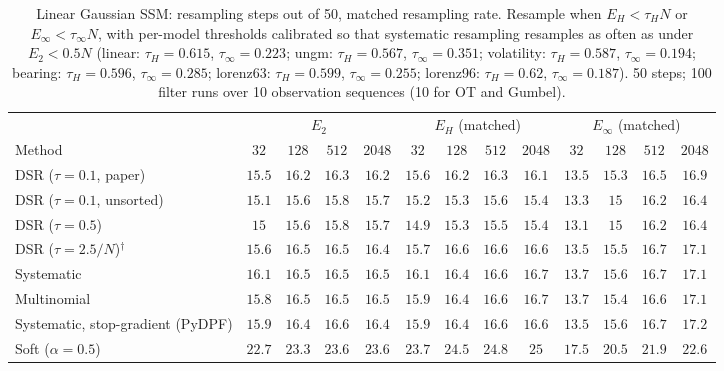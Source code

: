 \begin{table}[ht]
\centering
\small
\caption{Linear Gaussian SSM: resampling steps out of 50, matched resampling rate. Resample when $E_H<\tau_HN$ or $E_\infty<\tau_\infty N$, with per-model thresholds calibrated so that systematic resampling resamples as often as under $E_2<0.5N$ (linear: $\tau_H{=}0.615$, $\tau_\infty{=}0.223$; ungm: $\tau_H{=}0.567$, $\tau_\infty{=}0.351$; volatility: $\tau_H{=}0.587$, $\tau_\infty{=}0.194$; bearing: $\tau_H{=}0.596$, $\tau_\infty{=}0.285$; lorenz63: $\tau_H{=}0.599$, $\tau_\infty{=}0.255$; lorenz96: $\tau_H{=}0.62$, $\tau_\infty{=}0.187$). 50 steps; 100 filter runs over 10 observation sequences (10 for OT and Gumbel).}
\label{tab:trigger-matched-linear-resampling_steps}
\begin{adjustbox}{max width=\linewidth}
\begin{tabular}{lcccc|cccc|cccc}
\toprule
 & \multicolumn{4}{c}{$E_2$} & \multicolumn{4}{c}{$E_H$ (matched)} & \multicolumn{4}{c}{$E_\infty$ (matched)} \\
\cmidrule(lr){2-5} \cmidrule(lr){6-9} \cmidrule(lr){10-13}
Method & $32$ & $128$ & $512$ & $2048$ & $32$ & $128$ & $512$ & $2048$ & $32$ & $128$ & $512$ & $2048$ \\
\midrule
DSR ($\tau{=}0.1$, paper) & $15.5$ & $16.2$ & $16.3$ & $16.2$ & $15.6$ & $16.2$ & $16.3$ & $16.1$ & $13.5$ & $15.3$ & $16.5$ & $16.9$ \\
DSR ($\tau{=}0.1$, unsorted) & $15.1$ & $15.6$ & $15.8$ & $15.7$ & $15.2$ & $15.3$ & $15.6$ & $15.4$ & $13.3$ & $15$ & $16.2$ & $16.4$ \\
DSR ($\tau{=}0.5$) & $15$ & $15.6$ & $15.8$ & $15.7$ & $14.9$ & $15.3$ & $15.5$ & $15.4$ & $13.1$ & $15$ & $16.2$ & $16.4$ \\
DSR ($\tau{=}2.5/N$)$^\dagger$ & $15.6$ & $16.5$ & $16.5$ & $16.4$ & $15.7$ & $16.6$ & $16.6$ & $16.6$ & $13.5$ & $15.5$ & $16.7$ & $17.1$ \\
\midrule
Systematic & $16.1$ & $16.5$ & $16.5$ & $16.5$ & $16.1$ & $16.4$ & $16.6$ & $16.7$ & $13.7$ & $15.6$ & $16.7$ & $17.1$ \\
Multinomial & $15.8$ & $16.5$ & $16.5$ & $16.5$ & $15.9$ & $16.4$ & $16.6$ & $16.7$ & $13.7$ & $15.4$ & $16.6$ & $17.1$ \\
Systematic, stop-gradient (PyDPF) & $15.9$ & $16.4$ & $16.6$ & $16.4$ & $15.9$ & $16.4$ & $16.6$ & $16.6$ & $13.5$ & $15.6$ & $16.7$ & $17.2$ \\
Soft ($\alpha{=}0.5$) & $22.7$ & $23.3$ & $23.6$ & $23.6$ & $23.7$ & $24.5$ & $24.8$ & $25$ & $17.5$ & $20.5$ & $21.9$ & $22.6$ \\

\end{tabular}
\end{adjustbox}
\end{table}
